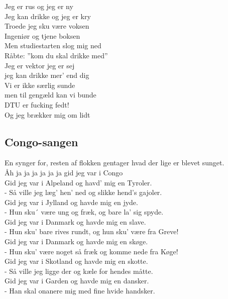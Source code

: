 Jeg er rus og jeg er ny\\
Jeg kan drikke og jeg er kry\\
Troede jeg sku være voksen\\
Ingeniør og tjene boksen\\
Men studiestarten slog mig ned\\
Råbte: ”kom du skal drikke med”\\

Jeg er vektor jeg er sej\\
jeg kan drikke mer’ end dig\\
Vi er ikke særlig sunde\\
men til gengæld kan vi bunde\\
DTU er fucking fedt!\\
Og jeg brækker mig om lidt\\

\subsection*{Congo-sangen}

En synger for, resten af flokken gentager hvad der lige er blevet sunget.\\

Åh ja ja ja ja ja ja gid jeg var i Congo\\

Gid jeg var i Alpeland og havd’ mig en Tyroler.\\
- Så ville jeg læg’ hen’ ned og slikke hend’s gajoler.\\

Gid jeg var i Jylland og havde mig en jyde.\\
- Hun sku´ være ung og fræk, og bare la’ sig spyde.\\

Gid jeg var i Danmark og havde mig en slave.\\
- Hun sku’ bare rives rundt, og hun sku’ være fra Greve!\\

Gid jeg var i Danmark og havde mig en skøge.\\
- Hun sku’ være noget så fræk og komme nede fra Køge!\\

Gid jeg var i Skotland og havde mig en skotte.\\
- Så ville jeg ligge der og kæle for hendes måtte.\\

Gid jeg var i Garden og havde mig en dansker.\\
- Han skal onanere mig med fine hvide handsker.\\

